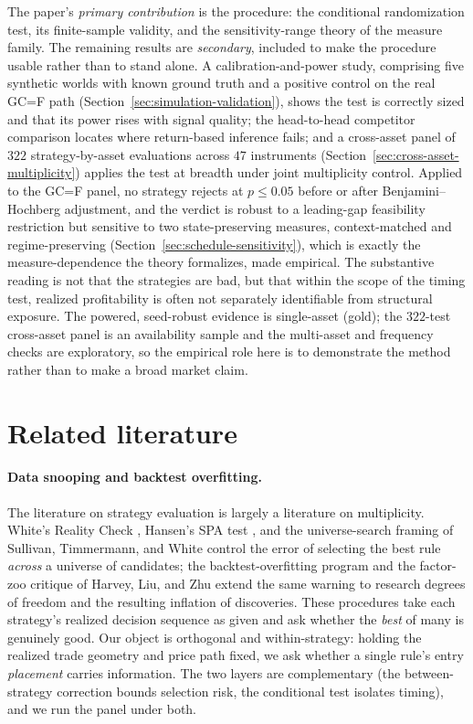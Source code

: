 \documentclass[preprint,12pt]{elsarticle}
\theoremstyle{definition}
\begin{document}
The paper's \emph{primary contribution} is the procedure: the conditional randomization
test, its finite-sample validity, and the sensitivity-range theory of the measure
family. The remaining results are \emph{secondary}, included to make the procedure
usable rather than
to stand alone. A calibration-and-power study, comprising five synthetic worlds with known ground
truth and a positive control on the real GC=F path
(Section~\ref{sec:simulation-validation}), shows the
test is correctly sized and that its power rises with signal quality; the head-to-head
competitor comparison locates where return-based inference fails; and a
cross-asset panel of $322$ strategy-by-asset evaluations across $47$ instruments
(Section~\ref{sec:cross-asset-multiplicity}) applies the test at breadth under joint
multiplicity control. Applied to the GC=F panel, no strategy rejects at $p\le0.05$ before
or after Benjamini--Hochberg adjustment, and the verdict is robust to a leading-gap
feasibility restriction but sensitive to two state-preserving measures, context-matched and regime-preserving
(Section~\ref{sec:schedule-sensitivity}), which is exactly the measure-dependence the
theory formalizes, made empirical. The substantive reading is not that the
strategies are bad, but that within the scope of the timing test, realized profitability
is often not separately identifiable from structural exposure. The powered, seed-robust
evidence is single-asset (gold); the $322$-test cross-asset panel is an availability
sample and the multi-asset and frequency checks are exploratory, so the empirical role
here is to demonstrate the method rather than to make a broad market claim.

\section{Related literature}

\paragraph{Data snooping and backtest overfitting.} The literature on strategy
evaluation is largely a literature on multiplicity. White's Reality Check
\cite{white2000}, Hansen's SPA test \cite{hansen2005}, and the universe-search framing of
Sullivan, Timmermann, and White \cite{sullivan1999} control the error of selecting the
best rule \emph{across} a universe of candidates; the backtest-overfitting program
\cite{bailey2017,baileylopez2014,lopezdeprado2018} and the factor-zoo critique of
Harvey, Liu, and Zhu \cite{harveyliuzhu2016} extend the same warning to research degrees
of freedom and the resulting inflation of discoveries. These procedures take each
strategy's realized decision sequence as given and ask whether the \emph{best} of many is
genuinely good. Our object is orthogonal and within-strategy: holding the realized trade
geometry and price path fixed, we ask whether a single rule's entry \emph{placement}
carries information. The two layers are complementary (the between-strategy correction
bounds selection risk, the conditional test isolates timing), and we run the panel under
both.
\end{document}
